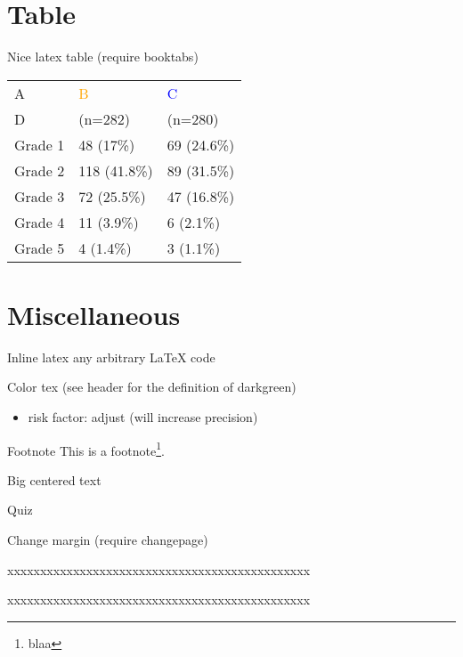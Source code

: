 \documentclass[table]{beamer}
\newcommand{\darkgreen}{green!50!black}
\begin{document}
\section{Table}
\label{sec:org4bee48c}

\begin{frame}[label={sec:orgd7f37a9}]{Nice latex table}
(require booktabs)

\begin{table}
\begin{tabular}{lll}
\toprule
A  & \textcolor{orange}{B} & \textcolor{blue}{C} \\
D & (n=282)  & (n=280) \\
\midrule
Grade 1 & 48 (17\%)  & 69 (24.6\%) \\
Grade 2 & 118 (41.8\%)  & 89 (31.5\%) \\
Grade 3 & 72 (25.5\%)  & 47 (16.8\%) \\
Grade 4 & 11 (3.9\%) & 6 (2.1\%) \\
Grade 5 & 4 (1.4\%)  & 3 (1.1\%) \\
\bottomrule
\end{tabular}
\end{table}
\end{frame}

\section{Miscellaneous}
\label{sec:orgc83a95d}

\begin{frame}[label={sec:org8cc8fd7}]{Inline latex}
any arbitrary LaTeX code
\end{frame}

\begin{frame}[label={sec:org246b285}]{Color tex}
(see header for the definition of darkgreen)
\begin{itemize}
\item \textcolor{\darkgreen}{risk factor}: adjust (will increase precision)
\end{itemize}
\end{frame}

\begin{frame}[label={sec:orgc996e26}]{Footnote}
This is a footnote\footnote{blaa}.
\end{frame}
\begin{frame}[label={sec:orgc4d94d8}]{Big centered text}
\vfill

\begin{center}
\Huge Quiz
\end{center}

\vfill
\end{frame}

\begin{frame}[label={sec:org20c70f6}]{Change margin}
(require changepage)
\begin{adjustwidth}{-1em}{-1em}
xxxxxxxxxxxxxxxxxxxxxxxxxxxxxxxxxxxxxxxxxxxxxx
\end{adjustwidth}
\begin{adjustwidth}{-3em}{-3em}
xxxxxxxxxxxxxxxxxxxxxxxxxxxxxxxxxxxxxxxxxxxxxx
\end{adjustwidth}
\end{frame}
\end{document}
